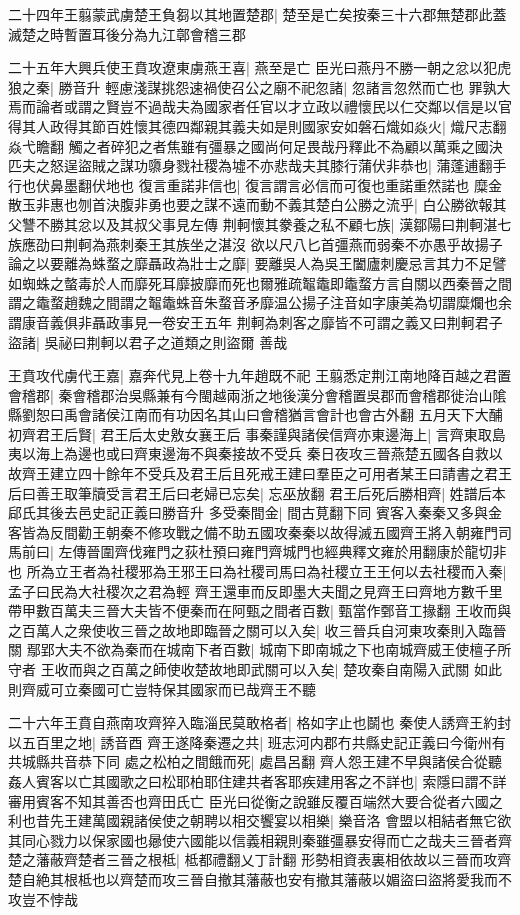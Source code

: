 二十四年王翦蒙武虜楚王負芻以其地置楚郡|{
	楚至是亡矣按秦三十六郡無楚郡此蓋滅楚之時暫置耳後分為九江鄣會稽三郡}


二十五年大興兵使王賁攻遼東虜燕王喜|{
	燕至是亡}
臣光曰燕丹不勝一朝之忿以犯虎狼之秦|{
	勝音升}
輕慮淺謀挑怨速禍使召公之廟不祀忽諸|{
	忽諸言忽然而亡也}
罪孰大焉而論者或謂之賢豈不過哉夫為國家者任官以才立政以禮懷民以仁交鄰以信是以官得其人政得其節百姓懷其德四鄰親其義夫如是則國家安如磐石熾如焱火|{
	熾尺志翻焱弋瞻翻}
觸之者碎犯之者焦雖有彊暴之國尚何足畏哉丹釋此不為顧以萬乘之國決匹夫之怒逞盜賊之謀功隳身戮社稷為墟不亦悲哉夫其膝行蒲伏非恭也|{
	蒲蓬逋翻手行也伏鼻墨翻伏地也}
復言重諾非信也|{
	復言謂言必信而可復也重諾重然諾也}
糜金散玉非惠也刎首決腹非勇也要之謀不遠而動不義其楚白公勝之流乎|{
	白公勝欲報其父讐不勝其忿以及其叔父事見左傳}
荆軻懷其豢養之私不顧七族|{
	漢鄒陽曰荆軻湛七族應劭曰荆軻為燕刺秦王其族坐之湛沒}
欲以尺八匕首彊燕而弱秦不亦愚乎故揚子論之以要離為蛛蝥之靡聶政為壯士之靡|{
	要離吳人為吳王闔廬刺慶忌言其力不足譬如蜘蛛之螫毒於人而靡死耳靡披靡而死也爾雅疏鼅鼄即鼄蝥方言自關以西秦晉之間謂之鼄蝥趙魏之間謂之鼅鼄蛛音朱蝥音矛靡温公揚子注音如字康美為切謂糜爛也余謂康音義俱非聶政事見一卷安王五年}
荆軻為刺客之靡皆不可謂之義又曰荆軻君子盜諸|{
	吳祕曰荆軻以君子之道類之則盜爾}
善哉

王賁攻代虜代王嘉|{
	嘉奔代見上卷十九年趙既不祀}
王翦悉定荆江南地降百越之君置會稽郡|{
	秦會稽郡治吳縣兼有今閩越兩浙之地後漢分會稽置吳郡而會稽郡徙治山隂縣劉恕曰禹會諸侯江南而有功因名其山曰會稽猶言會計也會古外翻}
五月天下大酺　初齊君王后賢|{
	君王后太史敫女襄王后}
事秦謹與諸侯信齊亦東邊海上|{
	言齊東取島夷以海上為邊也或曰齊東邊海不與秦接故不受兵}
秦日夜攻三晉燕楚五國各自救以故齊王建立四十餘年不受兵及君王后且死戒王建曰羣臣之可用者某王曰請書之君王后曰善王取筆牘受言君王后曰老婦已忘矣|{
	忘巫放翻}
君王后死后勝相齊|{
	姓譜后本郈氏其後去邑史記正義曰勝音升}
多受秦間金|{
	間古莧翻下同}
賓客入秦秦又多與金客皆為反間勸王朝秦不修攻戰之備不助五國攻秦秦以故得滅五國齊王將入朝雍門司馬前曰|{
	左傳晉圍齊伐雍門之荻杜預曰雍門齊城門也經典釋文雍於用翻康於龍切非也}
所為立王者為社稷邪為王邪王曰為社稷司馬曰為社稷立王王何以去社稷而入秦|{
	孟子曰民為大社稷次之君為輕}
齊王還車而反即墨大夫聞之見齊王曰齊地方數千里帶甲數百萬夫三晉大夫皆不便秦而在阿甄之間者百數|{
	甄當作鄄音工掾翻}
王收而與之百萬人之衆使收三晉之故地即臨晉之關可以入矣|{
	收三晉兵自河東攻秦則入臨晉關}
鄢郢大夫不欲為秦而在城南下者百數|{
	城南下即南城之下也南城齊威王使檀子所守者}
王收而與之百萬之師使收楚故地即武關可以入矣|{
	楚攻秦自南陽入武關}
如此則齊威可立秦國可亡豈特保其國家而已哉齊王不聽

二十六年王賁自燕南攻齊猝入臨淄民莫敢格者|{
	格如字止也鬬也}
秦使人誘齊王約封以五百里之地|{
	誘音酉}
齊王遂降秦遷之共|{
	班志河内郡冇共縣史記正義曰今衛州有共城縣共音恭下同}
處之松柏之間餓而死|{
	處昌呂翻}
齊人怨王建不早與諸侯合從聽姦人賓客以亡其國歌之曰松耶柏耶住建共者客耶疾建用客之不詳也|{
	索隱曰謂不詳審用賓客不知其善否也齊田氏亡}
臣光曰從衡之說雖反覆百端然大要合從者六國之利也昔先王建萬國親諸侯使之朝聘以相交饗宴以相樂|{
	樂音洛}
會盟以相結者無它欲其同心戮力以保家國也曏使六國能以信義相親則秦雖彊暴安得而亡之哉夫三晉者齊楚之藩蔽齊楚者三晉之根柢|{
	柢都禮翻乂丁計翻}
形勢相資表裏相依故以三晉而攻齊楚自絶其根柢也以齊楚而攻三晉自撤其藩蔽也安有撤其藩蔽以媚盜曰盜將愛我而不攻豈不悖哉

